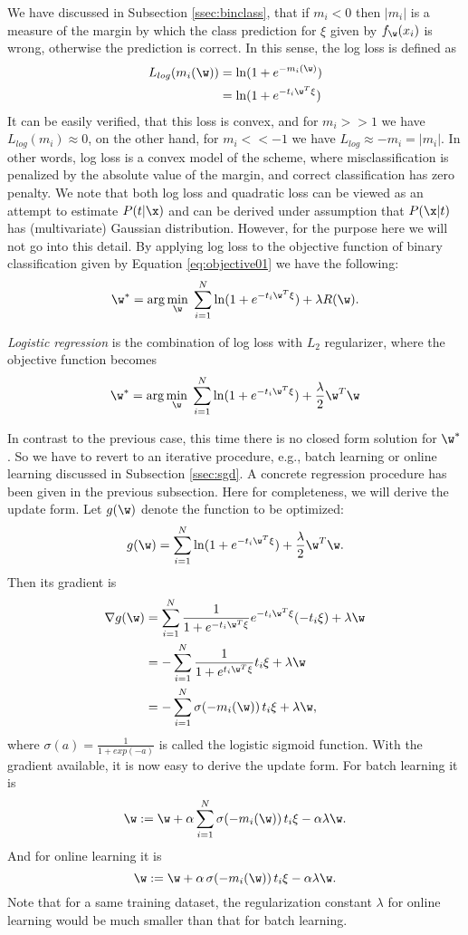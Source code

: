 We have discussed in Subsection \ref{ssec:binclass}, that if $m_i < 0$ then $|m_i|$ is a measure of the margin by which the class prediction for $\xi$ given by $f_{\w}(x_i)$ is wrong, otherwise the prediction is correct. In this sense, the log loss is defined as 
\[ \begin{split}
L_{log}(m_i(\w)) &= \ln (1 + e^{-m_i(\w)}) \\
 &= \ln (1 + e^{-t_i\w^T\xi}) 
\end{split} \] 
It can be easily verified, that this loss is convex, and for $m_i >> 1$ we have $L_{log}(m_i) \approx 0$, on the other hand, for $m_i << -1$ we have $L_{log} \approx -m_i = |m_i|$. In other words, log loss is a convex model of the scheme, where misclassification is penalized by the absolute value of the margin, and correct classification has zero penalty. We note that both log loss and quadratic loss can be viewed as an attempt to estimate $P(t|\x)$ and can be derived under assumption that $P(\x|t)$ has (multivariate) Gaussian distribution. However, for the purpose here we will not go into this detail. By applying log loss to the objective function of binary classification given by Equation \ref{eq:objective01} we have the following:
\begin{equation}
\label{eq:logobj}
\w^* = \arg\min_{\w} \; \sum_{i=1}^{N} \ln(1 + e^{-t_i\w^T\xi})  + \lambda R(\w).
\end{equation}

\emph{Logistic regression} is the combination of log loss with $L_2$ regularizer, where the objective function becomes 
\[ \begin{split}
\w^* & = \arg\min_{\w} \; \sum_{i=1}^{N} \ln(1 + e^{-t_i\w^T\xi}) + \frac{\lambda}{2} \w^T\w \\
\end{split} \]

In contrast to the previous case, this time there is no closed form solution for $\w^*$. So we have to revert to an iterative procedure, e.g., batch learning or online learning discussed in Subsection \ref{ssec:sgd}. A concrete regression procedure has been given in the previous subsection. Here for completeness, we will derive the update form. Let $g(\w)$ denote the function to be optimized:
$$ g(\w) = \sum_{i=1}^{N} \ln(1 + e^{-t_i\w^T\xi}) + \frac{\lambda}{2} \w^T\w.$$
Then its gradient is 
\[ \begin{split}
 \nabla g(\w) &= \sum_{i=1}^{N} \frac{1}{1+e^{-t_i \w^T \xi}}e^{-t_i \w^T \xi} (-t_i \xi) + \lambda \w \\
 &= - \sum_{i=1}^{N} \frac{1}{1 + e^{t_i \w^T \xi}} t_i \xi + \lambda \w \\
 &= - \sum_{i=1}^{N} \sigma(-m_i(\w)) \, t_i \xi + \lambda \w,
\end{split} \]
where $\sigma(a) = \frac{1}{1 + exp(-a)}$ is called the logistic sigmoid function. With the gradient available, it is now easy to derive the update form. For batch learning it is
$$\w := \w + \alpha \sum_{i=1}^{N} \sigma(-m_i(\w)) \, t_i \xi - \alpha \lambda \w.$$
And for online learning it is
$$\w := \w + \alpha \, \sigma(-m_i(\w)) \, t_i \xi - \alpha \lambda \w.$$
Note that for a same training dataset, the regularization constant $\lambda$ for online learning would be much smaller than that for batch learning. 


